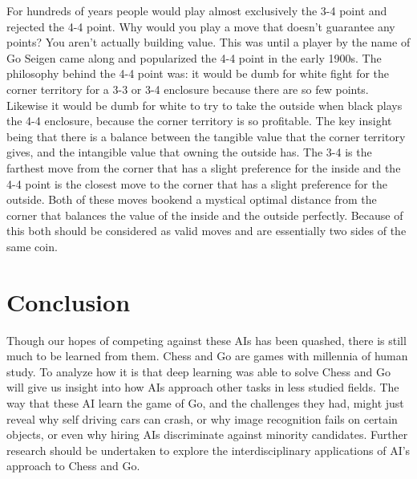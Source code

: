 \documentclass[12pt]{IEEEtran}
\begin{document}
\par For hundreds of years people would play almost exclusively the 3-4 point and rejected the 4-4 point. Why would you play a move that doesn't guarantee any points? You aren't actually building value. This was until  a player by the name of Go Seigen came along and popularized the 4-4 point in the early 1900s. The philosophy behind the 4-4 point was: it would be dumb for white fight for the corner territory for a 3-3 or 3-4 enclosure because there are so few points. Likewise it would be dumb for white to try to take the outside when black plays the 4-4 enclosure, because the corner territory is so profitable. The key insight being that there is a balance between the tangible value that the corner territory gives, and the intangible value that owning the outside has. The 3-4 is the farthest move from the corner that has a slight preference for the inside and the 4-4 point is the closest move to the corner that has a slight preference for the outside. Both of these moves bookend a mystical optimal distance from the corner that balances the value of the inside and the outside perfectly. Because of this both should be considered as valid moves and are essentially two sides of the same coin. 

\section{Conclusion}
Though our hopes of competing against these AIs has been quashed, there is still much to be learned from them. Chess and Go are games with millennia of human study. To analyze how it is that deep learning was able to solve Chess and Go will give us insight into how AIs approach other tasks in less studied fields. The way that these AI learn the game of Go, and the challenges they had, might just reveal why self driving cars can crash, or why image recognition fails on certain objects, or even why hiring AIs discriminate against minority candidates. Further research should be undertaken to explore the interdisciplinary applications of AI's approach to Chess and Go. 
\end{document}
